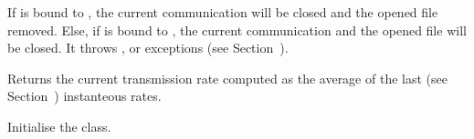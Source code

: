 \documentclass{ozdoc}
\begin{document}
\begin{mozartDESCRIPTION}
If  is bound to , the current communication will be closed and the opened file removed. Else, if  is bound to , the current communication and the opened file will be closed. It throws ,  or  exceptions (see Section~). \mozartEMPTY
{}\mozartENTRYHASCODE
\begin{mozartSYNOPSIS}
\begin{mozartCODEDISPLAY}\mozartFACETEXT{)}\end{mozartCODEDISPLAY}
\end{mozartSYNOPSIS}
\mozartITEM Returns the current transmission rate  computed as the average of the last  (see Section~) instanteous rates. \mozartEMPTY
{}\mozartENTRYHASCODE
\begin{mozartSYNOPSIS}
\begin{mozartCODEDISPLAY}\end{mozartCODEDISPLAY}
\end{mozartSYNOPSIS}
\mozartITEM Initialise the class. \mozartEMPTY
 \mozartEMPTY
{}\mozartENTRYHASCODE
\begin{mozartSYNOPSIS}
\begin{mozartCODEDISPLAY}\mozartFACETEXT{\mozartSPACE{}}\mozartFACETEXT{\mozartSPACE{}}\mozartFACETEXT{\mozartSPACE{}}\mozartFACETEXT{\mozartSPACE{}}\mozartFACETEXT{\mozartSPACE{}}\mozartFACETEXT{)}\end{mozartCODEDISPLAY}
\end{mozartSYNOPSIS}

\end{mozartDESCRIPTION}
\end{document}
